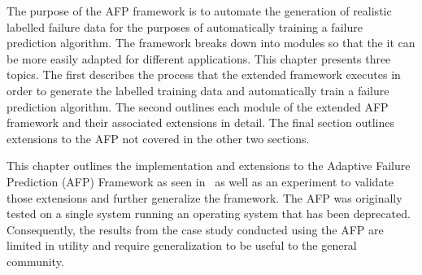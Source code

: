 The purpose of the AFP framework is to automate the generation of realistic
labelled failure data for the purposes of automatically training a failure
prediction algorithm.  The framework breaks down into modules so that the it
can be more easily adapted for different applications.  This chapter presents
three topics.  The first describes the process that the extended framework
executes in order to generate the labelled training data and automatically
train a failure prediction algorithm.  The second outlines each module of the
extended AFP framework and their associated extensions in detail.  The final
section outlines extensions to the AFP not covered in the other two sections.

This chapter outlines the implementation and extensions to the Adaptive Failure
Prediction (AFP) Framework as seen in~\cite{irrera2015} as well as an
experiment to validate those extensions and further generalize the framework.
The AFP was originally tested on a single system running an operating system
that has been deprecated.  Consequently, the results from the case study
conducted using the AFP are limited in utility and require generalization to be
useful to the general community.

